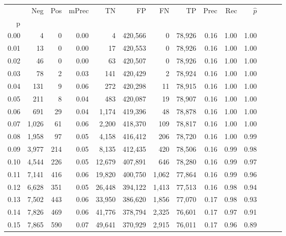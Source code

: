 \begin{tabular}{rrrrrrrrrrrrrr}
\toprule
{} &    Neg &    Pos & mPrec &       TN &       FP &      FN &      TP &  Prec &   Rec & $\hat{p}$ \\
p    &        &        &       &          &          &         &         &       &       &           \\
\midrule
0.00 &      4 &      0 &  0.00 &        4 &  420,566 &       0 &  78,926 &  0.16 &  1.00 &      1.00 \\
0.01 &     13 &      0 &  0.00 &       17 &  420,553 &       0 &  78,926 &  0.16 &  1.00 &      1.00 \\
0.02 &     46 &      0 &  0.00 &       63 &  420,507 &       0 &  78,926 &  0.16 &  1.00 &      1.00 \\
0.03 &     78 &      2 &  0.03 &      141 &  420,429 &       2 &  78,924 &  0.16 &  1.00 &      1.00 \\
0.04 &    131 &      9 &  0.06 &      272 &  420,298 &      11 &  78,915 &  0.16 &  1.00 &      1.00 \\
0.05 &    211 &      8 &  0.04 &      483 &  420,087 &      19 &  78,907 &  0.16 &  1.00 &      1.00 \\
0.06 &    691 &     29 &  0.04 &    1,174 &  419,396 &      48 &  78,878 &  0.16 &  1.00 &      1.00 \\
0.07 &  1,026 &     61 &  0.06 &    2,200 &  418,370 &     109 &  78,817 &  0.16 &  1.00 &      1.00 \\
0.08 &  1,958 &     97 &  0.05 &    4,158 &  416,412 &     206 &  78,720 &  0.16 &  1.00 &      0.99 \\
0.09 &  3,977 &    214 &  0.05 &    8,135 &  412,435 &     420 &  78,506 &  0.16 &  0.99 &      0.98 \\
0.10 &  4,544 &    226 &  0.05 &   12,679 &  407,891 &     646 &  78,280 &  0.16 &  0.99 &      0.97 \\
0.11 &  7,141 &    416 &  0.06 &   19,820 &  400,750 &   1,062 &  77,864 &  0.16 &  0.99 &      0.96 \\
0.12 &  6,628 &    351 &  0.05 &   26,448 &  394,122 &   1,413 &  77,513 &  0.16 &  0.98 &      0.94 \\
0.13 &  7,502 &    443 &  0.06 &   33,950 &  386,620 &   1,856 &  77,070 &  0.17 &  0.98 &      0.93 \\
0.14 &  7,826 &    469 &  0.06 &   41,776 &  378,794 &   2,325 &  76,601 &  0.17 &  0.97 &      0.91 \\
0.15 &  7,865 &    590 &  0.07 &   49,641 &  370,929 &   2,915 &  76,011 &  0.17 &  0.96 &      0.89 \\

\end{tabular}
